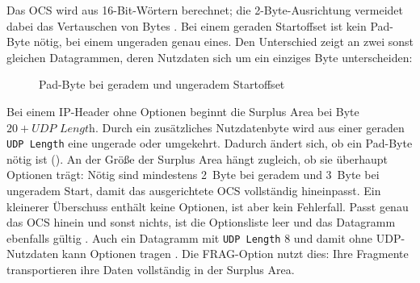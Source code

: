 Das OCS wird aus 16-Bit-Wörtern berechnet; die 2-Byte-Ausrichtung vermeidet dabei das Vertauschen von Bytes
\cite[Sec.~8]{rfc9868}. Bei einem geraden Startoffset ist kein Pad-Byte nötig, bei einem ungeraden genau
eines. Den Unterschied zeigt  an zwei sonst gleichen Datagrammen, deren Nutzdaten
sich um ein einziges Byte unterscheiden:

\begin{figure}[H]
  \centering
  \caption{Pad-Byte bei geradem und ungeradem Startoffset}
  \label{fig:surplus-pad}
\end{figure}

Bei einem IP-Header ohne Optionen beginnt die Surplus Area bei Byte $20 + \textit{UDP Length}$. Durch ein
zusätzliches Nutzdatenbyte wird aus einer geraden \texttt{UDP Length} eine ungerade oder umgekehrt. Dadurch
ändert sich, ob ein Pad-Byte nötig ist (). An der Größe der Surplus Area hängt
zugleich, ob sie überhaupt Optionen trägt: Nötig sind mindestens 2~Byte bei geradem und 3~Byte bei ungeradem
Start, damit das ausgerichtete OCS vollständig hineinpasst. Ein kleinerer Überschuss enthält keine
Optionen, ist aber kein Fehlerfall. Passt genau das OCS hinein und sonst nichts, ist die Optionsliste leer
und das Datagramm ebenfalls gültig \cite[Sec.~7 und 8]{rfc9868}. Auch ein Datagramm mit \texttt{UDP Length} 8
und damit ohne UDP-Nutzdaten kann Optionen tragen \cite[Sec.~8]{rfc9868}. Die FRAG-Option nutzt dies: Ihre
Fragmente transportieren ihre Daten vollständig in der Surplus Area.

